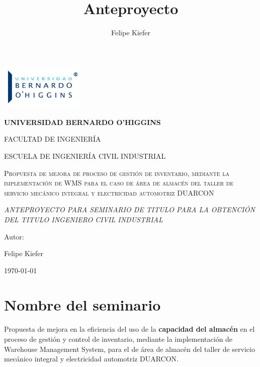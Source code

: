 \documentclass[a4papper,11pt]{article}
\title{Anteproyecto}
\author{Felipe Kiefer}
\begin{document}
  \begin{titlepage}
    \raggedright
    {\includegraphics[width=0.3\textwidth]{ubo}\par}
    \centering
    {\bfseries\LARGE UNIVERSIDAD BERNARDO O’HIGGINS \par}
    \vspace{1cm}
    {\scshape\Large FACULTAD DE INGENIER\'IA \par}
    \vspace{1cm}
    {\scshape\Large ESCUELA DE INGENIER\'IA CIVIL INDUSTRIAL \par}
    \vspace{1cm}
    {\scshape\Large Propuesta de mejora de proceso de gestión de inventario, mediante la implementación de WMS para el caso de área de almacén del taller de servicio mecánico integral y electricidad automotriz DUARCON \par}
    \vspace{1cm}
    {\itshape\Large ANTEPROYECTO PARA SEMINARIO DE TITULO PARA LA OBTENCIÓN DEL TITULO INGENIERO CIVIL INDUSTRIAL \par}
    \vfill
    {\Large Autor: \par}
    {\Large Felipe Kiefer \par}
    \vfill
    {\Large \today \par}
  \end{titlepage}
\tableofcontents
\newpage
\listoffigures
\newpage

\def \name {Felipe Kiefer}
\def \mlm {mercado automotor de livianos y medianos}

  \section{Nombre del seminario}
    Propuesta de mejora \cite{heizer} en \autocite{heizer} la eficiencia del uso de la \textbf{capacidad del almacén} en el proceso de gestión y control de inventario, mediante la implementación de Warehouse Management System, para el de área de almacén del taller de servicio mecánico integral y electricidad automotriz DUARCON.
\end{document}
